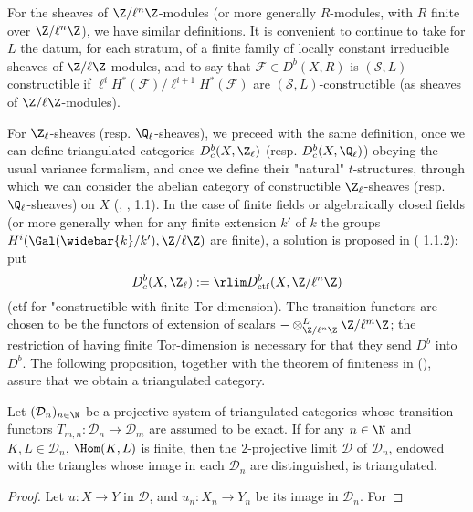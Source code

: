 For the sheaves of $\Z/\ell^n\Z$-modules (or more generally $R$-modules, with $R$ finite over $\Z/\ell^n\Z$), we have similar definitions. It is convenient to continue to take for $L$ the datum, for each stratum, of a finite family of locally constant irreducible sheaves of $\Z/\ell\Z$-modules, and to say that $\mathscr{F}\in D^b(X,R)$ is $(\mathcal{S},L)$-constructible if $\ell^iH^*(\mathscr{F})/\ell^{i+1}H^*(\mathscr{F})$ are $(\mathscr{S},L)$-constructible (as sheaves of $\Z/\ell\Z$-modules).\par

For $\Z_\ell$-sheaves (resp. $\Q_\ell$-sheaves), we preceed with the same definition, once we can define triangulated categories $D_c^b(X,\Z_\ell)$ (resp. $D^b_c(X,\Q_\ell)$) obeying the usual variance formalism, and once we define their "natural" $t$-structures, through which we can consider the abelian category of constructible $\Z_\ell$-sheaves (resp. $\Q_\ell$-sheaves) on $X$ (\cite{SGA5}, , 1.1). In the case of finite fields or algebraically closed fields (or more generally when for any finite extension $k'$ of $k$ the groups $H^i(\Gal(\widebar{k}/k'),\Z/\ell\Z)$ are finite), a solution is proposed in (\cite{*} 1.1.2): put
\begin{equation}\label{triangle cat Z_ell etale perverse sheaf over scheme-1}
D^b_c(X,\Z_\ell):=\rlim D^b_{\mathrm{ctf}}(X,\Z/\ell^n\Z)
\end{equation}
(ctf for "constructible with finite Tor-dimension). The transition functors are chosen to be the functors of extension of scalars $-\otimes_{\Z/\ell^n\Z}^L\Z/\ell^m\Z$; the restriction of having finite Tor-dimension is necessary for that they send $D^b$ into $D^b$. The following proposition, together with the theorem of finiteness in (\cite{*}), assure that we obtain a triangulated category.

\begin{proposition}\label{triangle cat 2-proj limit triangle if finite Hom}
Let $(\mathcal{D}_n)_{n\in\N}$ be a projective system of triangulated categories whose transition functors $T_{m,n}:\mathcal{D}_n\to\mathcal{D}_m$ are assumed to be exact. If for any $n\in\N$ and $K,L\in\mathcal{D}_n$, $\Hom(K,L)$ is finite, then the $2$-projective limit $\mathcal{D}$ of $\mathcal{D}_n$, endowed with the triangles whose image in each $\mathcal{D}_n$ are distinguished, is triangulated.
\end{proposition}
\begin{proof}
Let $u:X\to Y$ in $\mathcal{D}$, and $u_n:X_n\to Y_n$ be its image in $\mathcal{D}_n$. For
\end{proof}


